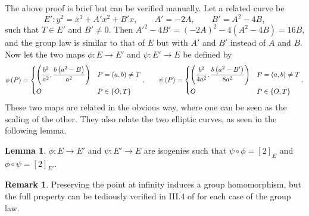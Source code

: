 \documentclass{article}
\newcommand{\rb}[1]{\left( #1 \right)}
\renewcommand{\sb}[1]{\left[ #1 \right]}
\newcommand{\cb}[1]{\left\{ #1 \right\}}
\theoremstyle{definition}\newtheorem*{definition}{Definition}
\theoremstyle{definition}\newtheorem*{example}{Example}
\theoremstyle{definition}\newtheorem*{remark}{Remark}
\newtheorem{lemma}[proposition]{Lemma}
\begin{document}
The above proof is brief but can be verified manually. Let a related curve be
$$ E' : y^2 = x^3 + A'x^2 + B'x, \qquad A' = -2A, \qquad B' = A^2 - 4B, $$
such that $ T \in E' $ and $ B' \ne 0 $. Then $ A'^2 - 4B' = \rb{-2A}^2 - 4\rb{A^2 - 4B} = 16B $, and the group law is similar to that of $ E $ but with $ A' $ and $ B' $ instead of $ A $ and $ B $. Now let the two maps $ \phi : E \to E' $ and $ \psi : E' \to E $ be defined by
$$ \phi\rb{P} = \begin{dcases} \rb{\dfrac{b^2}{a^2}, \dfrac{b\rb{a^2 - B}}{a^2}} & P = \rb{a, b} \ne T \\ O & P \in \cb{O, T} \end{dcases}, \qquad \psi\rb{P} = \begin{dcases} \rb{\dfrac{b^2}{4a^2}, \dfrac{b\rb{a^2 - B'}}{8a^2}} & P = \rb{a, b} \ne T \\ O & P \in \cb{O, T} \end{dcases}. $$
These two maps are related in the obvious way, where one can be seen as the scaling of the other. They also relate the two elliptic curves, as seen in the following lemma.

\begin{lemma}
$ \phi : E \to E' $ and $ \psi : E' \to E $ are isogenies such that $ \psi \circ \phi = \sb{2}_E $ and $ \phi \circ \psi = \sb{2}_{E'} $.
\end{lemma}

\begin{remark}
Preserving the point at infinity induces a group homomorphism, but the full property can be tediously verified in III.4 of \cite{utm} for each case of the group law.
\end{remark}
\end{document}
